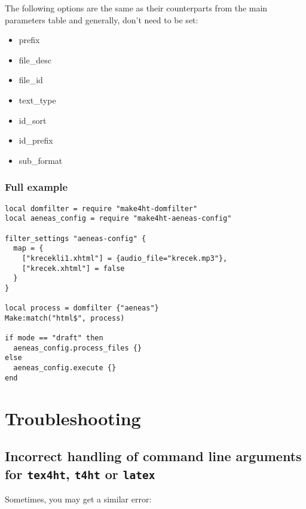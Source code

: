 The following options are the same as their counterparts from the main
parameters table and generally, don't need to be set:

\begin{itemize}
\tightlist
\item
  prefix
\item
  file\_desc
\item
  file\_id
\item
  text\_type
\item
  id\_sort
\item
  id\_prefix
\item
  sub\_format
\end{itemize}

\hypertarget{full-example}{%
\subsubsection{Full example}\label{full-example}}

\begin{verbatim}
local domfilter = require "make4ht-domfilter"
local aeneas_config = require "make4ht-aeneas-config"

filter_settings "aeneas-config" {
  map = {
    ["krecekli1.xhtml"] = {audio_file="krecek.mp3"}, 
    ["krecek.xhtml"] = false
  }
}

local process = domfilter {"aeneas"}
Make:match("html$", process)

if mode == "draft" then
  aeneas_config.process_files {}
else
  aeneas_config.execute {}
end
\end{verbatim}

\hypertarget{troubleshooting}{%
\section{Troubleshooting}\label{troubleshooting}}

\hypertarget{incorrect-handling-of-command-line-arguments-for-tex4ht-t4ht-or-latex}{%
\subsection{\texorpdfstring{Incorrect handling of command line arguments
for \texttt{tex4ht}, \texttt{t4ht} or
\texttt{latex}}{Incorrect handling of command line arguments for tex4ht, t4ht or latex}}\label{incorrect-handling-of-command-line-arguments-for-tex4ht-t4ht-or-latex}}

Sometimes, you may get a similar error:

